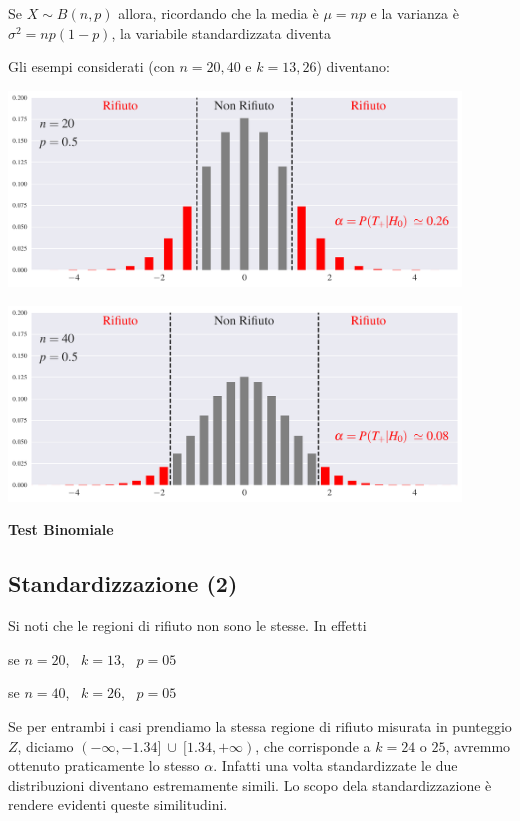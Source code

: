 \documentclass[12pt,openany]{book}
\theoremstyle{mio}
\theoremstyle{liscio}
\begin{document}
Se $X\sim B(n,p)$ allora, ricordando che la media è $\mu=np$ e la varianza è $\sigma^2=np(1-p)$, la variabile standardizzata diventa




Gli esempi considerati (con $n=20,40$ e $k=13,26$) diventano: 

\hfil\includegraphics[width=0.9\textwidth]{figure/B-test-standard_01.pdf}

\hfil\includegraphics[width=0.9\textwidth]{figure/B-test-standard_02.pdf}


\hfill{}\clearpage\hfill\textbf{Test Binomiale}
\subsection{Standardizzazione (2)}

Si noti che le regioni di rifiuto non sono le stesse. In effetti


\qquad se $n=20$, \ $k=13$, \ $p=05$


\qquad se $n=40$, \ $k=26$, \ $p=05$


Se per entrambi i casi prendiamo la stessa regione di rifiuto misurata in punteggio $Z$, diciamo $(-\infty, -1.34]\ \cup\ [1.34, +\infty)$, che corrisponde a $k=24$ o $25$,  avremmo ottenuto praticamente lo stesso $\alpha$. Infatti una volta standardizzate le due distribuzioni diventano estremamente simili. Lo scopo dela standardizzazione è rendere evidenti queste similitudini.  
\end{document}
